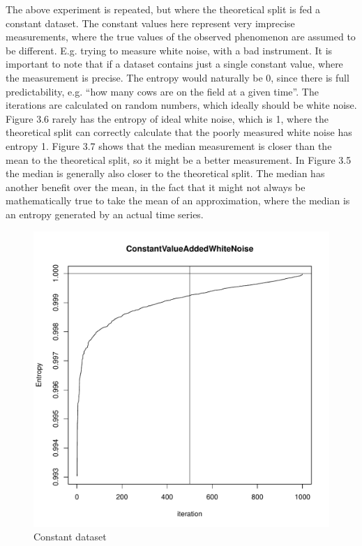 The above experiment is repeated, but where the theoretical split is fed a constant dataset. The constant values here represent very imprecise measurements, where the true values of the observed phenomenon are assumed to be different. E.g. trying to measure white noise, with a bad instrument. It is important to note that if a dataset contains just a single constant value, where the measurement is precise. The entropy would naturally be 0, since there is full predictability, e.g. “how many cows are on the field at a given time”. The iterations are calculated on random numbers, which ideally should be white noise. Figure 3.6 rarely has the entropy of ideal white noise, which is 1, where the theoretical split can correctly calculate that the poorly measured white noise has entropy 1. Figure 3.7 shows that the median measurement is closer than the mean to the theoretical split, so it might be a better measurement. In Figure 3.5 the median is generally also closer to the theoretical split. The median has another benefit over the mean, in the fact that it might not always be mathematically true to take the mean of an approximation, where the median is an entropy generated by an actual time series.

\begin{figure}
    \centering
\includegraphics[width=\textwidth,keepaspectratio]{Weather/constantWithWhiteNoiseStochasticTheoretical.pdf}
    \caption{Constant dataset}
\end{figure}

